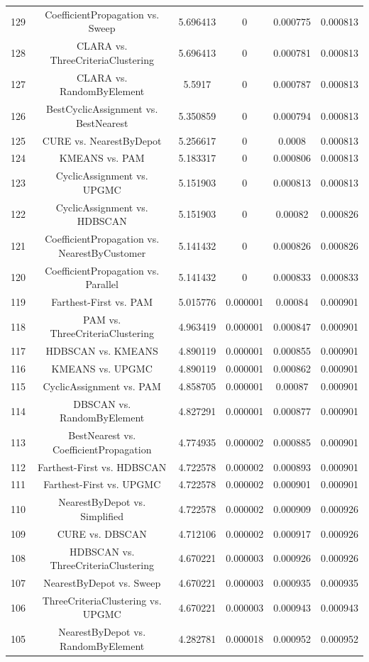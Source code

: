 \documentclass[a4paper,10pt]{article}
\begin{document}
\begin{landscape}
\begin{table}[!htp]
\begin{tabular}{cccccc}
129&CoefficientPropagation vs. Sweep&5.696413&0&0.000775&0.000813\\
128&CLARA vs. ThreeCriteriaClustering&5.696413&0&0.000781&0.000813\\
127&CLARA vs. RandomByElement&5.5917&0&0.000787&0.000813\\
126&BestCyclicAssignment vs. BestNearest&5.350859&0&0.000794&0.000813\\
125&CURE vs. NearestByDepot&5.256617&0&0.0008&0.000813\\
124&KMEANS vs. PAM&5.183317&0&0.000806&0.000813\\
123&CyclicAssignment vs. UPGMC&5.151903&0&0.000813&0.000813\\
122&CyclicAssignment vs. HDBSCAN&5.151903&0&0.00082&0.000826\\
121&CoefficientPropagation vs. NearestByCustomer&5.141432&0&0.000826&0.000826\\
120&CoefficientPropagation vs. Parallel&5.141432&0&0.000833&0.000833\\
119&Farthest-First vs. PAM&5.015776&0.000001&0.00084&0.000901\\
118&PAM vs. ThreeCriteriaClustering&4.963419&0.000001&0.000847&0.000901\\
117&HDBSCAN vs. KMEANS&4.890119&0.000001&0.000855&0.000901\\
116&KMEANS vs. UPGMC&4.890119&0.000001&0.000862&0.000901\\
115&CyclicAssignment vs. PAM&4.858705&0.000001&0.00087&0.000901\\
114&DBSCAN vs. RandomByElement&4.827291&0.000001&0.000877&0.000901\\
113&BestNearest vs. CoefficientPropagation&4.774935&0.000002&0.000885&0.000901\\
112&Farthest-First vs. HDBSCAN&4.722578&0.000002&0.000893&0.000901\\
111&Farthest-First vs. UPGMC&4.722578&0.000002&0.000901&0.000901\\
110&NearestByDepot vs. Simplified&4.722578&0.000002&0.000909&0.000926\\
109&CURE vs. DBSCAN&4.712106&0.000002&0.000917&0.000926\\
108&HDBSCAN vs. ThreeCriteriaClustering&4.670221&0.000003&0.000926&0.000926\\
107&NearestByDepot vs. Sweep&4.670221&0.000003&0.000935&0.000935\\
106&ThreeCriteriaClustering vs. UPGMC&4.670221&0.000003&0.000943&0.000943\\
105&NearestByDepot vs. RandomByElement&4.282781&0.000018&0.000952&0.000952\\

\end{tabular}
\end{table}
\end{landscape}
\end{document}
